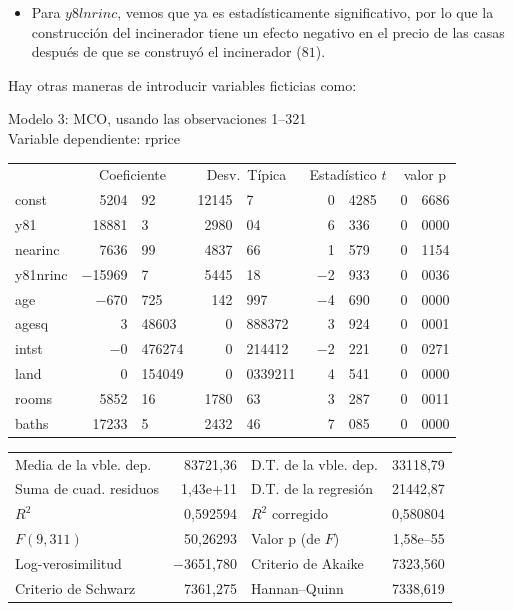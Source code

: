 \begin{itemize}
    \item Para $y8lnrinc$, vemos que ya es estadísticamente significativo, por lo que la construcción del incinerador tiene un efecto negativo en el precio de las casas después de que se construyó el incinerador ($81$).
\end{itemize}


Hay otras maneras de introducir variables ficticias como:


\begin{center}

Modelo 3: MCO, usando las observaciones 1--321\\
Variable dependiente: rprice\\

\vspace{1em}

\begin{tabular}{lr@{,}lr@{,}lr@{,}lr@{,}l}
  &
 \multicolumn{2}{c}{Coeficiente} &
  \multicolumn{2}{c}{Desv.\ Típica} &
   \multicolumn{2}{c}{Estadístico $t$} &
    \multicolumn{2}{c}{valor p} \\[1ex]
const &
  5204&92 &
    12145&7 &
      0&4285 &
        0&6686 \\
y81 &
  18881&3 &
    2980&04 &
      6&336 &
        0&0000 \\
nearinc &
  7636&99 &
    4837&66 &
      1&579 &
        0&1154 \\
y81nrinc &
  $-$15969&7 &
    5445&18 &
      $-$2&933 &
        0&0036 \\
age &
  $-$670&725 &
    142&997 &
      $-$4&690 &
        0&0000 \\
agesq &
  3&48603 &
    0&888372 &
      3&924 &
        0&0001 \\
intst &
  $-$0&476274 &
    0&214412 &
      $-$2&221 &
        0&0271 \\
land &
  0&154049 &
    0&0339211 &
      4&541 &
        0&0000 \\
rooms &
  5852&16 &
    1780&63 &
      3&287 &
        0&0011 \\
baths &
  17233&5 &
    2432&46 &
      7&085 &
        0&0000 \\
\end{tabular}

\vspace{1ex}
\begin{tabular}{lrlr}
Media de la vble. dep. &  83721,36 & D.T. de la vble. dep. &  33118,79 \\
Suma de cuad. residuos &  1,43\textrm{e+11} & D.T. de la regresión &  21442,87 \\
$R^2$ &  0,592594 & $R^2$ corregido &  0,580804 \\
$F(9, 311)$ &  50,26293 & Valor p (de $F$) &  1,58\textrm{e--55} \\
Log-verosimilitud & $-$3651,780 & Criterio de Akaike &  7323,560 \\
Criterio de Schwarz &  7361,275 & Hannan--Quinn &  7338,619 \\
\end{tabular}


\end{center}

